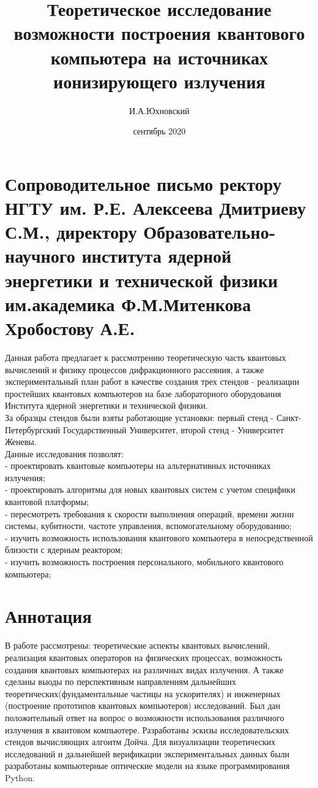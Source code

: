 \documentclass[11pt]{report}
\title{\textbf{Теоретическое исследование возможности построения квантового компьютера на источниках ионизирующего излучения}}
\author{И.А.Юхновский}
\date{сентябрь 2020}
\begin{document}
\maketitle
\thispagestyle{empty}
\section*{Сопроводительное письмо ректору НГТУ им. Р.Е. Алексеева Дмитриеву С.М., директору Образовательно-научного института ядерной энергетики и технической физики им.академика Ф.М.Митенкова Хробостову А.Е.}

Данная работа предлагает к рассмотрению теоретическую часть квантовых вычислений и физику процессов дифракционного рассеяния, а также экспериментальный план работ в качестве создания трех стендов - реализации простейших квантовых компьютеров на базе лабораторного оборудования Института ядерной энергетики и технической физики.\\

За образцы стендов были взяты работающие установки: первый стенд - Санкт-Петербургский Государственный Университет, второй стенд - Университет Женевы. \\

Данные исследования позволят:\\
- проектировать квантовые компьютеры на альтернативных источниках излучения; \\
- проектировать алгоритмы для новых квантовых систем с учетом специфики квантовой платформы;\\
- пересмотреть требования к скорости выполнения операций, времени жизни системы, кубитности, частоте управления, вспомогательному оборудованию; \\
- изучить возможность использования квантового компьютера в непосредственной близости с ядерным реактором;\\
- изучить возможность построения персонального, мобильного квантового компьютера; \\


\section*{Аннотация}
В работе рассмотрены: теоретические аспекты квантовых вычислений, реализация квантовых операторов на физических процессах, возможность создания квантовых компьютерах на различных видах излучения. А также сделаны выоды по перспективным направлениям дальнейших теоретических(фундаментальные частицы на ускорителях) и инженерных (построение прототипов квантовых компьютеров) исследований. Был дан положительный ответ на вопрос о возможности использования различного излучения в квантовом компьютере. Разработаны эскизы исследовательских стендов вычисляющих алгоитм Дойча. Для визуализации теоретических исследований и дальнейшей верификации экспериментальных данных были разработаны компьютерные оптические модели на языке программирования Python.
\end{document}
